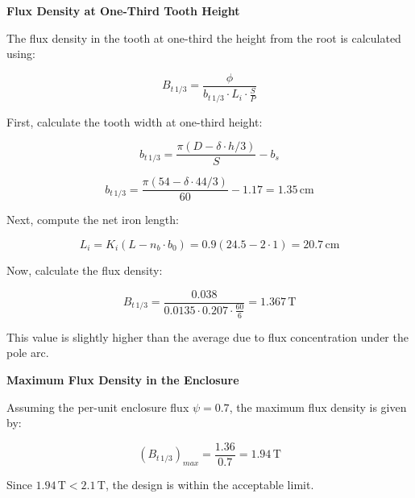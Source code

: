\documentclass[12pt]{article}
\begin{document}
\vspace{10pt}

\noindent
\textbf{Flux Density at One-Third Tooth Height}

The flux density in the tooth at one-third the height from the root is calculated using:

\[
B_{t\,1/3} = \frac{\phi}{b_{t\,1/3} \cdot L_i \cdot \frac{S}{P}}
\]

First, calculate the tooth width at one-third height:

\[
b_{t\,1/3} = \frac{\pi (D - \delta \cdot h/3)}{S} - b_s
\]

\[
b_{t\,1/3} = \frac{\pi (54 - \delta \cdot 44 / 3)}{60} - 1.17 = 1.35\, \text{cm}
\]

Next, compute the net iron length:

\[
L_i = K_i (L - n_b \cdot b_0) = 0.9 (24.5 - 2 \cdot 1) = 20.7\, \text{cm}
\]

Now, calculate the flux density:

\[
B_{t\,1/3} = \frac{0.038}{0.0135 \cdot 0.207 \cdot \frac{60}{6}} = 1.367\, \text{T}
\]

This value is slightly higher than the average due to flux concentration under the pole arc.

\vspace{10pt}

\noindent
\textbf{Maximum Flux Density in the Enclosure}

Assuming the per-unit enclosure flux $\psi = 0.7$, the maximum flux density is given by:

\[
(B_{t\,1/3})_{max} = \frac{1.36}{0.7} = 1.94\, \text{T}
\]

Since $1.94\, \text{T} < 2.1\, \text{T}$, the design is within the acceptable limit.
\end{document}
